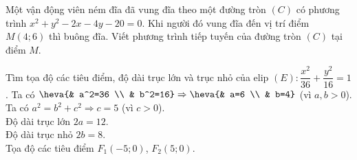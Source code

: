 \begin{bt}%
	Một vận động viên ném đĩa đã vung đĩa theo một đường tròn $(C)$ có phương trình $x^2+y^2-2x-4y-20=0$. Khi người đó vung đĩa đến vị trí điểm $M(4;6)$ thì buông đĩa. Viết phương trình tiếp tuyến của đường tròn $(C)$ tại điểm $M$.
\end{bt}

\begin{bt}%
	Tìm tọa độ các tiêu điểm, độ dài trục lớn và trục nhỏ của elip $(E)\colon \dfrac{x^2}{36}+\dfrac{y^2}{16}=1$.
	\loigiai
	{
		Ta có $\heva{& a^2=36 \\ & b^2=16}\Rightarrow \heva{& a=6 \\ & b=4}$ (vì $a,b>0$).\\
		Ta có $a^2=b^2+c^2\Rightarrow c=5$ (vì $c>0$).\\
		Độ dài trục lớn $2a=12$.\\
		Độ dài trục nhỏ $2b=8$.\\
		Tọa độ các tiêu điểm $F_1(-5;0)$, $F_2(5;0)$.
	}
\end{bt}


